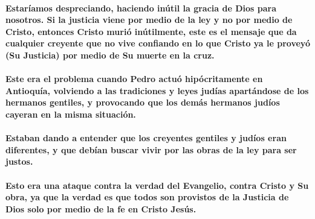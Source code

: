 \documentclass[11a pt,twoside]{article}
\let\oldparagraph\paragraph
\renewcommand{\paragraph}{\needspace{3\baselineskip}\oldparagraph}
\begin{document}
\paragraph{Estaríamos despreciando, haciendo inútil la gracia de Dios
para nosotros. Si la justicia viene por medio de la ley y no por medio
de Cristo, entonces Cristo murió inútilmente, este es el mensaje que da
cualquier creyente que no vive confiando en lo que Cristo ya le proveyó
(Su Justicia) por medio de Su muerte en la
cruz.}\label{estaruxedamos-despreciando-haciendo-inuxfatil-la-gracia-de-dios-para-nosotros.-si-la-justicia-viene-por-medio-de-la-ley-y-no-por-medio-de-cristo-entonces-cristo-muriuxf3-inuxfatilmente-este-es-el-mensaje-que-da-cualquier-creyente-que-no-vive-confiando-en-lo-que-cristo-ya-le-proveyuxf3-su-justicia-por-medio-de-su-muerte-en-la-cruz.}

\paragraph{Este era el problema cuando Pedro actuó hipócritamente en
Antioquía, volviendo a las tradiciones y leyes judías apartándose de los
hermanos gentiles, y provocando que los demás hermanos judíos cayeran en
la misma
situación.}\label{este-era-el-problema-cuando-pedro-actuuxf3-hipuxf3critamente-en-antioquuxeda-volviendo-a-las-tradiciones-y-leyes-juduxedas-apartuxe1ndose-de-los-hermanos-gentiles-y-provocando-que-los-demuxe1s-hermanos-juduxedos-cayeran-en-la-misma-situaciuxf3n.}

\paragraph{Estaban dando a entender que los creyentes gentiles y judíos
eran diferentes, y que debían buscar vivir por las obras de la ley para
ser
justos.}\label{estaban-dando-a-entender-que-los-creyentes-gentiles-y-juduxedos-eran-diferentes-y-que-debuxedan-buscar-vivir-por-las-obras-de-la-ley-para-ser-justos.}

\paragraph{Esto era una ataque contra la verdad del Evangelio, contra
Cristo y Su obra, ya que la verdad es que todos son provistos de la
Justicia de Dios solo por medio de la fe en Cristo
Jesús.}\label{esto-era-una-ataque-contra-la-verdad-del-evangelio-contra-cristo-y-su-obra-ya-que-la-verdad-es-que-todos-son-provistos-de-la-justicia-de-dios-solo-por-medio-de-la-fe-en-cristo-jesuxfas.}
\end{document}

